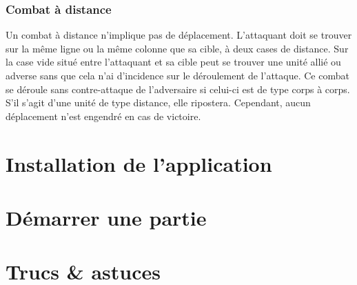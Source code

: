 \documentclass[a4paper]{article}
\begin{document}
\subsubsection{Combat à distance}
Un combat à distance n'implique pas de déplacement. L'attaquant doit se trouver sur la même ligne ou la même colonne que sa cible, à deux cases de distance. Sur la case vide situé entre l'attaquant et sa cible peut se trouver une unité allié ou adverse sans que cela n'ai d'incidence sur le déroulement de l'attaque.
Ce combat se déroule sans contre-attaque de l'adversaire si celui-ci est de type corps à corps. S'il s'agit d'une unité de type distance, elle ripostera. Cependant, aucun déplacement n'est engendré en cas de victoire.

\section{Installation de l'application}
\paragraph{}

\section{Démarrer une partie}
\paragraph{}

\section{Trucs & astuces}
\paragraph{}
\end{document}

